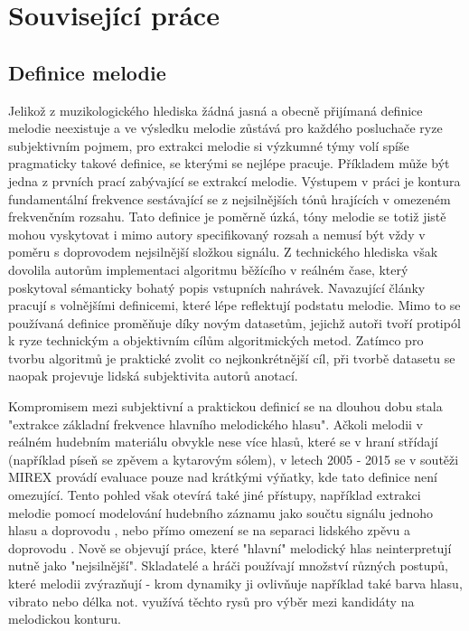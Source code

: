 \chapter{Související práce}

\section{Definice melodie}


Jelikož z muzikologického hlediska žádná jasná a obecně přijímaná definice melodie neexistuje a ve výsledku melodie zůstává pro každého posluchače ryze subjektivním pojmem, pro extrakci melodie si výzkumné týmy volí spíše pragmaticky takové definice, se kterými se nejlépe pracuje. Příkladem může být jedna z prvních prací zabývající se extrakcí melodie. Výstupem v práci \cite{Goto1999} je kontura fundamentální frekvence sestávající se z nejsilnějších tónů hrajících v omezeném frekvenčním rozsahu. Tato definice je poměrně úzká, tóny melodie se totiž jistě mohou vyskytovat i mimo autory specifikovaný rozsah a nemusí být vždy v poměru s doprovodem nejsilnější složkou signálu. Z technického hlediska však dovolila autorům implementaci algoritmu běžícího v reálném čase, který poskytoval sémanticky bohatý popis vstupních nahrávek. Navazující články pracují s volnějšími definicemi, které lépe reflektují podstatu melodie. Mimo to se používaná definice proměňuje díky novým datasetům, jejichž autoři tvoří protipól k ryze technickým a objektivním cílům algoritmických metod. Zatímco pro tvorbu algoritmů je praktické zvolit co nejkonkrétnější cíl, při tvorbě datasetu se naopak projevuje lidská subjektivita autorů anotací. 

Kompromisem mezi subjektivní a praktickou definicí se na dlouhou dobu stala "extrakce základní frekvence hlavního melodického hlasu". Ačkoli melodii v reálném hudebním materiálu obvykle nese více hlasů, které se v hraní střídají (například píseň se zpěvem a kytarovým sólem), v letech 2005 - 2015 se v soutěži MIREX provádí evaluace pouze nad krátkými výňatky, kde tato definice není omezující. Tento pohled však otevírá také jiné přístupy, například extrakci melodie pomocí modelování hudebního záznamu jako součtu signálu jednoho hlasu a doprovodu \citep{Durrieu2010}, \citep{Bosch2016b} nebo přímo omezení se na separaci lidského zpěvu a doprovodu \citep{Ikemiya2016}. Nově se objevují práce, které "hlavní" melodický hlas neinterpretují nutně jako "nejsilnější". Skladatelé a hráči používají množství různých postupů, které melodii zvýrazňují - krom dynamiky ji ovlivňuje například také barva hlasu, vibrato nebo délka not. \cite{Salamon2012a} využívá těchto rysů pro výběr mezi kandidáty na melodickou konturu.

